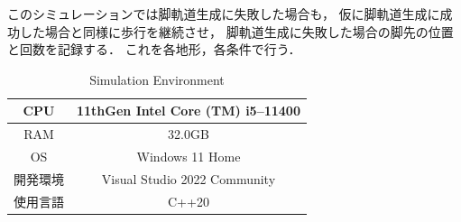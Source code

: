 このシミュレーションでは脚軌道生成に失敗した場合も，
仮に脚軌道生成に成功した場合と同様に歩行を継続させ，
脚軌道生成に失敗した場合の脚先の位置と回数を記録する．
これを各地形，各条件で行う．

\begin{table}[htbp]
	\caption{Simulation Environment}
	\label{tab:simulation_env}  %
	\begin{center}
   	\begin{tabular}{|c||c|} \hline  %
      CPU & 11thGen Intel Core (TM) i5--11400  \\ \hline  %
      RAM & 32.0GB  \\ \hline  %
      OS & Windows 11 Home  \\ \hline  %
      開発環境 & Visual Studio 2022 Community  \\ \hline  %
      使用言語 & C++20  \\ \hline  %
    \end{tabular}
  \end{center}
\end{table}

\newpage

